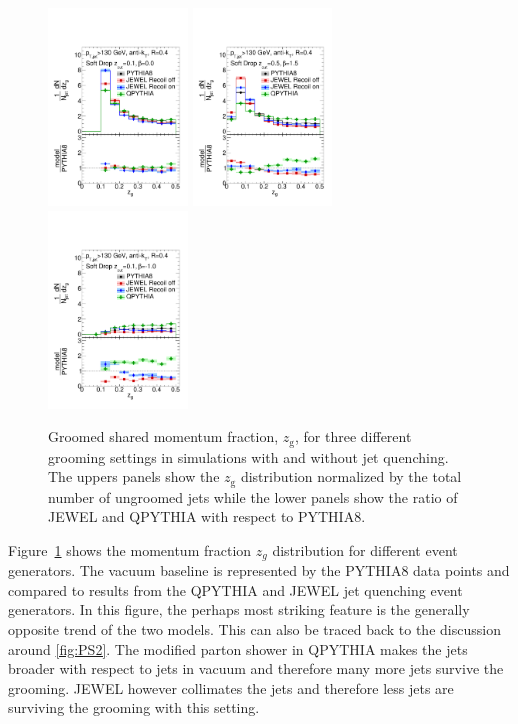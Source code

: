 \begin{figure}[t]
\centering
\includegraphics[width=0.33\textwidth]{figures/SDGen/ZgCompModelsBeta00Z01.pdf}%
\includegraphics[width=0.33\textwidth]{figures/SDGen/ZgCompModelsBeta15Z05.pdf}%
\includegraphics[width=0.33\textwidth]{figures/SDGen/ZgCompModelsBetam1Z01.pdf}%
\caption{Groomed shared momentum fraction, $z_{\mathrm{g}}$, for three different grooming settings in simulations with and without jet quenching. The uppers panels show the $z_{\mathrm{g}}$ distribution normalized by the total number of ungroomed jets while the lower panels show the ratio of JEWEL and QPYTHIA with respect to PYTHIA8.}
\label{fig:SDGenZG}
\end{figure}
Figure~\ref{fig:SDGenZG} shows the momentum fraction $z_g$ distribution for different event generators. The vacuum baseline is represented by the PYTHIA8 data points and compared to results from the QPYTHIA and JEWEL jet quenching event generators.
In this figure, the perhaps most striking feature is the generally opposite trend of the two models. This can also be traced back to the discussion around \autoref{fig:PS2}. The modified parton shower in QPYTHIA makes the jets broader with respect to jets in vacuum and therefore many more jets survive the grooming. JEWEL however collimates the jets and therefore less jets are surviving the grooming with this setting.

